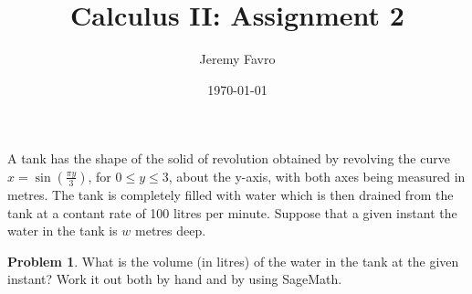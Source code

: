 \documentclass[10pt]{article}
\title{Calculus II: Assignment 2}
\author{Jeremy Favro}
\date{\today}
\theoremstyle{definition}
\newtheorem{problem}{Problem}
\begin{document}
\maketitle

A tank has the shape of the solid of revolution obtained by revolving the curve $x = \sin(\frac{\pi y}{3})$,
for $0 \leq y \leq 3$, about the y-axis, with both axes being measured in metres. The tank is completely filled with water which is then drained from the tank at a contant rate
of 100 litres per minute. Suppose that a given instant the water in the tank is $w$ metres deep.

\begin{problem}
What is the volume (in litres) of the water in the tank at the given instant? Work it out both
by hand and by using SageMath.
\end{problem}
\end{document}
